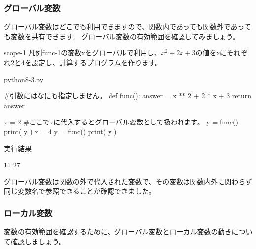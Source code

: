 \documentclass[11pt,a4paper,dvipdfmx,titlepage]{jsreport}
\begin{document}
\subsubsection{グローバル変数}
グローバル変数はどこでも利用できますので、関数内であっても関数外であっても変数を共有できます。
グローバル変数の有効範囲を確認してみましょう。

\begin{pabox}{scope-1}
凡例func-1の変数xをグローバルで利用し、$x^2 + 2 x + 3$の値をxにそれぞれ2と4を設定し、計算するプログラムを作ります。


\begin{codebox}{python8-3.py}
\begin{listing}{1}
#引数にはなにも指定しません。
def func():
    answer = x ** 2 + 2 * x + 3
    return answer

x = 2
#ここでxに代入するとグローバル変数として扱われます。
y = func()
print( y )
x = 4
y = func()
print( y )
\end{listing}
実行結果
\begin{listing}{1}
11
27
\end{listing}
\end{codebox}
\end{pabox}
グローバル変数は関数の外で代入された変数で、その変数は関数内外に関わらず同じ変数名で参照できることが確認できました。

\newpage
\subsubsection{ローカル変数}
変数の有効範囲を確認するために、グローバル変数とローカル変数の動きについて確認しましょう。
\end{document}
